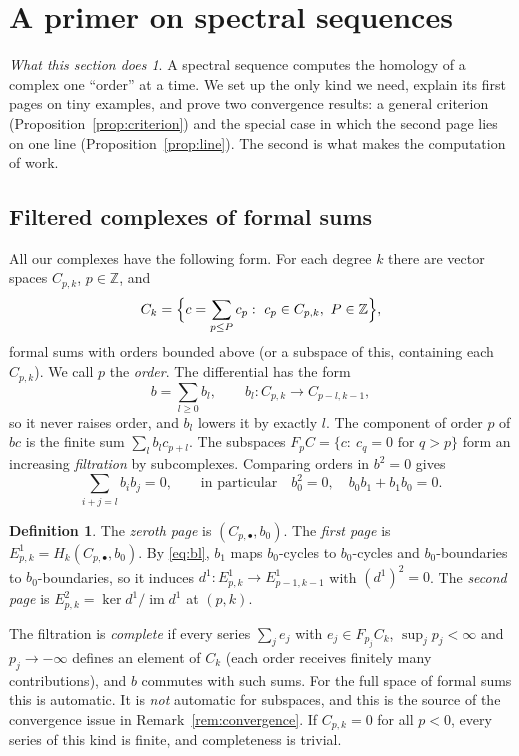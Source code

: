\documentclass[11pt,oneside,reqno]{article}
\DeclareMathOperator{\Ran}{im}
\newcommand{\Z}{\mathbb Z}
\theoremstyle{plain}
\theoremstyle{definition}
\newtheorem{definition}[theorem]{Definition}
\theoremstyle{remark}
\newtheorem*{whatdoes}{What this section does}
\begin{document}
\section{A primer on spectral sequences}\label{sec:ss}

\begin{whatdoes}
A spectral sequence computes the homology of a complex one ``order'' at a
time. We set up the only kind we need, explain its first pages on tiny
examples, and prove two convergence results: a general criterion
(Proposition~\ref{prop:criterion}) and the special case in which the second
page lies on one line (Proposition~\ref{prop:line}). The second is what
makes the computation of \cite{BG} work.
\end{whatdoes}

\subsection{Filtered complexes of formal sums}\label{subsec:filtered}
All our complexes have the following form. For each degree \(k\) there are
vector spaces \(C_{p,k}\), \(p\in\Z\), and
\[
 C_k=\Bigl\{c=\sum_{p\le P}c_p:\ c_p\in C_{p,k},\ P\in\Z\Bigr\},
\]
formal sums with orders bounded above (or a subspace of this, containing each
\(C_{p,k}\)). We call \(p\) the \emph{order}. The differential has the form
\[
 b=\sum_{l\ge0}b_l,\qquad b_l:C_{p,k}\to C_{p-l,k-1},
\]
so it never raises order, and \(b_l\) lowers it by exactly \(l\). The
component of order \(p\) of \(bc\) is the finite sum \(\sum_lb_lc_{p+l}\). The
subspaces \(F_pC=\{c:\ c_q=0\text{ for }q>p\}\) form an increasing
\emph{filtration} by subcomplexes. Comparing orders in \(b^2=0\) gives
\begin{equation}\label{eq:bl}
 \sum_{i+j=l}b_ib_j=0,\qquad\text{in particular}\quad b_0^2=0,\quad
 b_0b_1+b_1b_0=0 .
\end{equation}

\begin{definition}\label{def:E1E2}
The \emph{zeroth page} is \((C_{p,\bullet},b_0)\). The \emph{first page} is
\(E^1_{p,k}=H_k(C_{p,\bullet},b_0)\). By \eqref{eq:bl}, \(b_1\) maps
\(b_0\)-cycles to \(b_0\)-cycles and \(b_0\)-boundaries to \(b_0\)-boundaries, so it
induces \(d^1:E^1_{p,k}\to E^1_{p-1,k-1}\) with \((d^1)^2=0\). The \emph{second
page} is \(E^2_{p,k}=\ker d^1/\Ran d^1\) at \((p,k)\).
\end{definition}

The filtration is \emph{complete} if every series \(\sum_je_j\) with
\(e_j\in F_{p_j}C_k\), \(\sup_jp_j<\infty\) and \(p_j\to-\infty\) defines an element
of \(C_k\) (each order receives finitely many contributions), and \(b\) commutes
with such sums. For the full space of formal sums this is automatic. It is
\emph{not} automatic for subspaces, and this is the source of the
convergence issue in Remark~\ref{rem:convergence}. If \(C_{p,k}=0\) for all
\(p<0\), every series of this kind is finite, and completeness is trivial.
\end{document}
